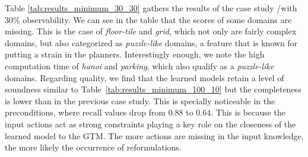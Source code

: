 Table \ref{tab:results_minimum_30_30} gathers the results of the case study \PO/\PO with 30\% observability.  We can see in the table that the scores of some domains are missing. This is the case of {\em floor-tile} and {\em grid}, which not only are fairly complex domains, but also categorized as \emph{puzzle-like} domains, a feature that is known for putting a strain in the planners. Interestingly enough, we note the high computation time of {\em hanoi} and {\em parking}, which also qualify as a \emph{puzzle-like} domains. Regarding quality, we find that the learned models retain a level of soundness similar to Table~\ref{tab:results_minimum_100_10} but the completeness is lower than in the previous case study. This is specially noticeable in the preconditions, where recall values drop from 0.88 to 0.64. This is because the input actions act as strong constraints playing a key role on the closeness of the learned model to the GTM. The more actions are missing in the input knowledge, the more likely the occurrence of reformulations.

